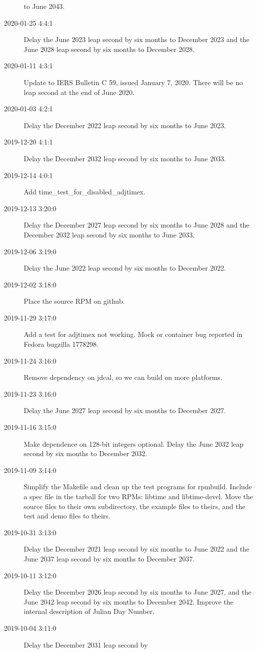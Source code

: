 \documentclass[letterpaper,twoside]{article}
\begin{document}
\begin{description}
  to June 2043.
\item[2020-01-25 4:4:1]Delay the June 2023 leap second by six months
  to December 2023 and the June 2028 leap second by six months to December 2028.
\item[2020-01-11 4:3:1]Update to IERS Bulletin C 59, issued January 7, 2020.
  There will be no leap second at the end of June 2020.
\item[2020-01-03 4:2:1]Delay the December 2022 leap second by six months
  to June 2023.
\item[2019-12-20 4:1:1]Delay the December 2032 leap second by six months
  to June 2033.
\item[2019-12-14 4:0:1]Add {\ttfamily time\_test\_for\_disabled\_adjtimex}.
\item[2019-12-13 3:20:0]Delay the December 2027 leap second by six months
  to June 2028 and the December 2032 leap second by six months to June 2033.
\item[2019-12-06 3:19:0]Delay the June 2022 leap second by six months
  to December 2022.
\item[2019-12-02 3:18:0]Place the source RPM on github.
\item[2019-11-29 3:17:0]Add a test for adjtimex not working.
  Mock or container bug reported in Fedora bugzilla 1778298.
\item[2019-11-24 3:16:0]Remove dependency on jdcal, so we can build
  on more platforms.
\item[2019-11-23 3:16:0]Delay the June 2027 leap second by six months
  to December 2027.
\item[2019-11-16 3:15:0]Make dependence on 128-bit integers optional.
  Delay the June 2032 leap second by six months to December 2032.
\item[2019-11-09 3:14:0]Simplify the Makefile and clean up the
  test programs for rpmbuild.  Include a spec file in the tarball
  for two RPMs: libtime and libtime-devel.  Move the source
  files to their own subdirectory, the example files to theirs,
  and the test and demo files to theirs.
\item[2019-10-31 3:13:0]Delay the December 2021 leap second by
  six months to June 2022 and the June 2037 leap second by six
  months to December 2037.
\item[2019-10-11 3:12:0]Delay the December 2026 leap second by
  six months to June 2027, and the June 2042 leap second by six
  months to December 2042.  Improve the internal description of
  Julian Day Number.
\item[2019-10-04 3:11:0]Delay the December 2031 leap second by

\end{description}
\end{document}
